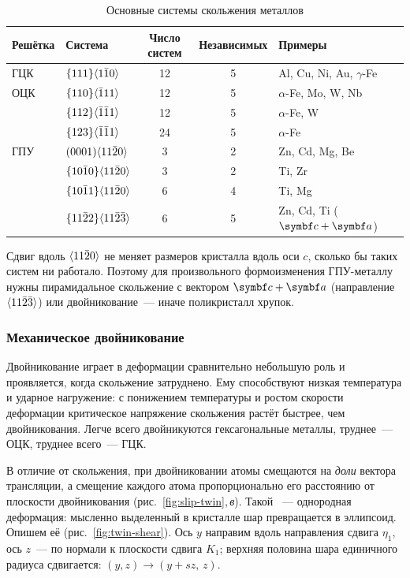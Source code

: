 \begin{table}[ht]
\centering
\caption{Основные системы скольжения металлов}
\label{tab:slip-systems}
\small
\begin{tabular}{@{}llccl@{}}
\toprule
Решётка & Система & Число систем & Независимых & Примеры\\
\midrule
ГЦК & $\{111\}\langle 1\bar{1}0\rangle$ & 12 & 5 & Al, Cu, Ni, Au, $\gamma$-Fe\\
ОЦК & $\{110\}\langle \bar{1}11\rangle$ & 12 & 5 & $\alpha$-Fe, Mo, W, Nb\\
    & $\{112\}\langle \bar{1}\bar{1}1\rangle$ & 12 & 5 & $\alpha$-Fe, W\\
    & $\{123\}\langle \bar{1}\bar{1}1\rangle$ & 24 & 5 & $\alpha$-Fe\\
ГПУ & $(0001)\langle 11\bar{2}0\rangle$ & 3 & 2 & Zn, Cd, Mg, Be\\
    & $\{10\bar{1}0\}\langle 11\bar{2}0\rangle$ & 3 & 2 & Ti, Zr\\
    & $\{10\bar{1}1\}\langle 11\bar{2}0\rangle$ & 6 & 4 & Ti, Mg\\
    & $\{11\bar{2}2\}\langle 11\bar{2}\bar{3}\rangle$ & 6 & 5 & Zn, Cd, Ti ($\vb c+\vb a$)\\
\bottomrule
\end{tabular}
\end{table}

Сдвиг вдоль $\langle 11\bar{2}0\rangle$ не меняет размеров кристалла вдоль оси $c$,
сколько бы таких систем ни работало. Поэтому для произвольного
формоизменения ГПУ-металлу нужны пирамидальное скольжение с вектором
$\vb c+\vb a$ (направление $\langle 11\bar{2}\bar{3}\rangle$) или двойникование~— иначе
поликристалл хрупок.

\subsubsection{Механическое двойникование}

Двойникование играет в деформации сравнительно небольшую роль и
проявляется, когда скольжение затруднено. Ему способствуют низкая
температура и ударное нагружение: с понижением температуры и ростом
скорости деформации критическое напряжение скольжения растёт быстрее, чем
двойникования. Легче всего двойникуются гексагональные металлы, труднее~—
ОЦК, труднее всего~— ГЦК.

В отличие от скольжения, при двойниковании атомы смещаются на \emph{доли}
вектора трансляции, а смещение каждого атома пропорционально его
расстоянию от плоскости двойникования (рис.~\ref{fig:slip-twin},\,\textit{в}).
Такой ~— однородная деформация: мысленно выделенный в
кристалле шар превращается в эллипсоид. Опишем её
(рис.~\ref{fig:twin-shear}). Ось $y$ направим вдоль направления сдвига
$\eta_1$, ось $z$~— по нормали к плоскости сдвига $K_1$; верхняя
половина шара единичного радиуса сдвигается: $(y,z)\to(y+sz,\,z)$.

